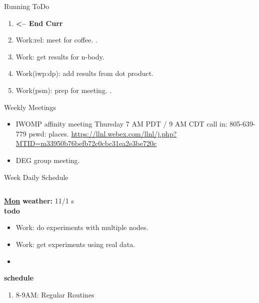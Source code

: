 \begin{columns}
\begin{column}{0.6\linewidth}
\begin{block}{Running ToDo}
\begin{enumerate}
        \item \tiny \textbf{ <-- End Curr } 

        \item \tiny Work:rel: meet for coffee. . 
        \item \tiny Work: get results for n-body.
        \item \tiny Work(iwp:dp): add results from dot product.    
        \item \tiny Work(psm): prep for meeting. . 
        \end{enumerate}
      \end{block}
      
      \begin{block}{Weekly Meetings}
        \begin{itemize}
          \tiny \item \tiny IWOMP affinity meeting Thursday 7 AM PDT / 9 AM
          CDT call in: 805-639-779 pswd: places. \url{https://llnl.webex.com/llnl/j.php?MTID=m33950b76befb72c0cbc31ea2e3be720c}
        \item \tiny DEG group meeting.  
        \end{itemize}
      \end{block} 
      \begin{block}{Week Daily Schedule}
        \begin{columns}
          \begin{column}{0.14\textwidth}{\small \underline{\bf Mon}}
            {\tiny \bf {\tiny weather:} } {\tiny 11/1 s} \\ 
            {\tiny \bf {\tiny todo}}\\ 
            \begin{itemize}
              \tiny \item \tiny Work: do experiments with multiple nodes. 
            \item \tiny Work: get experiments using real data.  
            \item \tiny 
            \end{itemize}
                {\small  \bf schedule}\\
                \begin{enumerate} 
                  \tiny \item \tiny 8-9AM: Regular Routines 
                \end{enumerate}
          \end{column}


\end{columns}
\end{block}
\end{column}
\end{columns}
